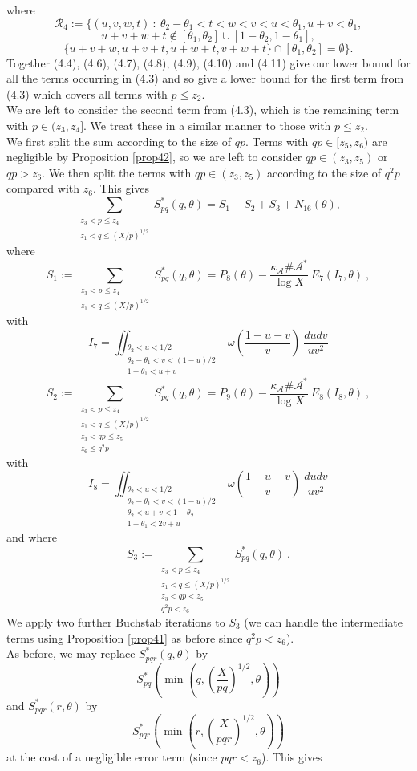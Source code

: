 \documentclass{amsart}
\numberwithin{equation}{subsection}
\begin{document}
where
$$\mathcal{R}_4:=\{(u,v,w,t)\::\: \theta_2-\theta_1<t<w<v<u<\theta_1, u+v<\theta_1, $$
$$u+v+w+t\not\in[\theta_1, \theta_2]\cup [1-\theta_2, 1-\theta_1],$$
$$\{u+v+w, u+v+t, u+w+t, v+w+t\}\cap[\theta_1, \theta_2]=\emptyset\}.$$
%
Together (4.4), (4.6), (4.7), (4.8), (4.9), (4.10) and (4.11) give our lower bound for all the terms occurring in (4.3) and so give a lower bound for the first term from (4.3) which covers all terms with $p\leq z_2$.\\
We are left to consider the second term from (4.3), which is the remaining term with $p\in (z_3, z_4]$. We treat these in a similar manner to those with $p\leq z_2$.\\
We first split the sum according to the size of $qp$. Terms with $qp\in[z_5, z_6)$ are negligible by Proposition \ref{prop42}, so we are left to consider $qp\in(z_3, z_5)$ or $qp>z_6$. We then split the terms with $qp\in(z_3, z_5)$ according to the size of $q^2p$ compared with $z_6$. This gives
$$\sum_{\substack{z_3<p\leq z_4 \\ z_1<q\leq (X/p)^{1/2}}} S_{pq}^*(q, \theta)=S_1+S_2+S_3+N_{16}(\theta),$$
where
$$S_1:=\sum_{\substack{z_3<p\leq z_4 \\ z_1<q\leq (X/p)^{1/2}}} S_{pq}^*(q, \theta)=P_8(\theta)-\frac{\kappa_{\mathcal{A}}\#\mathcal{A}^*}{\log X}\: E_7(I_7, \theta)\:,$$
with
$$I_7=\iint_{\substack{\theta_2<u<1/2 \\ \theta_2-\theta_1<v<(1-u)/2 \\ 1-\theta_1<u+v}} \omega\left(\frac{1-u-v}{v}\right)\:\frac{dudv}{uv^2}$$
$$S_2:=\sum_{\substack{z_3<p\leq z_4 \\ z_1<q\leq (X/p)^{1/2} \\ z_3<qp\leq z_5 \\ z_6\leq q^2p}} S_{pq}^*(q, \theta)=P_9(\theta)-\frac{\kappa_{\mathcal{A}}\#\mathcal{A}^*}{\log X}\: E_8(I_8, \theta)\:,$$
with
\[
I_8=\iint_{\substack{\theta_2<u<1/2 \\ \theta_2-\theta_1<v<(1-u)/2 \\ \theta_2<u+v<1-\theta_2 \\ 1-\theta_1<2v+u}} \omega\left(\frac{1-u-v}{v}\right)\:\frac{dudv}{uv^2}  \tag{4.12}
\]
and where
$$S_3:=\sum_{\substack{z_3<p\leq z_4 \\ z_1<q\leq (X/p)^{1/2} \\ z_3<qp< z_5 \\ q^2p<z_6}} S_{pq}^*(q, \theta)\:.$$
%
We apply two further Buchstab iterations to $S_3$ (we can handle the intermediate terms using Proposition \ref{prop41} as before since $q^2p<z_6$).\\
As before, we may replace $S_{pqr}^*(q, \theta)$ by 
$$S_{pq}^*\left(\min\left(q, \left(\frac{X}{pq}\right)^{1/2}, \theta\right)\right)$$
and $S_{pqr}^*(r, \theta)$ by
$$S_{pqr}^*\left(\min\left(r, \left(\frac{X}{pqr}\right)^{1/2}, \theta\right)\right)$$
at the cost of a negligible error term (since $pqr<z_6$). This gives
\end{document}
